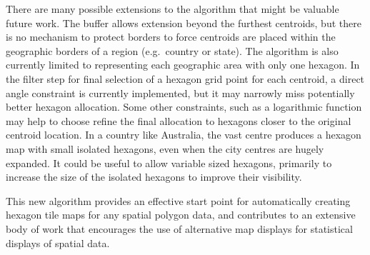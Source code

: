 There are many possible extensions to the algorithm that might be
valuable future work. The buffer allows extension beyond the furthest
centroids, but there is no mechanism to protect borders to force
centroids are placed within the geographic borders of a region
(e.g.~country or state). The algorithm is also currently limited to
representing each geographic area with only one hexagon. In the filter
step for final selection of a hexagon grid point for each centroid, a
direct angle constraint is currently implemented, but it may narrowly
miss potentially better hexagon allocation. Some other constraints, such
as a logarithmic function may help to choose refine the final allocation
to hexagons closer to the original centroid location. In a country like
Australia, the vast centre produces a hexagon map with small isolated
hexagons, even when the city centres are hugely expanded. It could be
useful to allow variable sized hexagons, primarily to increase the size
of the isolated hexagons to improve their visibility.

This new algorithm provides an effective start point for automatically
creating hexagon tile maps for any spatial polygon data, and contributes
to an extensive body of work that encourages the use of alternative map
displays for statistical displays of spatial data.



\address{%
Stephanie Kobakian\\
Monash University\\%
Department of Econometrics and Business Statistics\\
%
%
%
\href{mailto:stephanie.kobakian@monash.edu}{\nolinkurl{stephanie.kobakian@monash.edu}}%
}

\address{%
Dianne Cook\\
Monash University\\%
Department of Econometrics and Business Statistics\\
%
%
%
\href{mailto:dicook@monash.edu}{\nolinkurl{dicook@monash.edu}}%
}

\address{%
Earl Duncan\\
Queensland University of Technology\\%
School of Mathematical Sciences\\
%
%
%
\href{mailto:earl.duncan@qut.edu.au}{\nolinkurl{earl.duncan@qut.edu.au}}%
}
